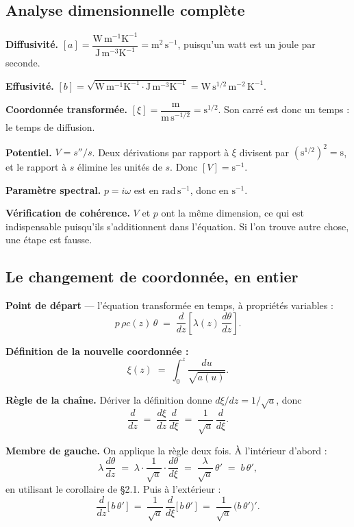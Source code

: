 \documentclass[11pt,a4paper]{article}
\begin{document}
\subsection{Analyse dimensionnelle complète}

\textbf{Diffusivité.}
$[a] = \dfrac{\mathrm{W\,m^{-1}K^{-1}}}{\mathrm{J\,m^{-3}K^{-1}}} = \mathrm{m^{2}\,s^{-1}}$,
puisqu'un watt est un joule par seconde.

\textbf{Effusivité.}
$[b] = \sqrt{\mathrm{W\,m^{-1}K^{-1}} \cdot \mathrm{J\,m^{-3}K^{-1}}}
= \mathrm{W\,s^{1/2}\,m^{-2}\,K^{-1}}$.

\textbf{Coordonnée transformée.}
$[\xi] = \dfrac{\mathrm{m}}{\mathrm{m\,s^{-1/2}}} = \mathrm{s^{1/2}}$.
Son carré est donc un temps : le temps de diffusion.

\textbf{Potentiel.} $V = s''/s$. Deux dérivations par rapport à $\xi$ divisent par
$(\mathrm{s^{1/2}})^{2} = \mathrm{s}$, et le rapport à $s$ élimine les unités de $s$. Donc
$[V] = \mathrm{s^{-1}}$.

\textbf{Paramètre spectral.} $p = i\omega$ est en $\mathrm{rad\,s^{-1}}$, donc en $\mathrm{s^{-1}}$.

\textbf{Vérification de cohérence.} $V$ et $p$ ont la même dimension, ce qui est indispensable
puisqu'ils s'additionnent dans l'équation. Si l'on trouve autre chose, une étape est fausse.

\subsection{Le changement de coordonnée, en entier}

\textbf{Point de départ} --- l'équation transformée en temps, à propriétés variables :
\[ p\,\rho c(z)\,\theta \;=\; \frac{d}{dz}\!\left[\lambda(z)\,\frac{d\theta}{dz}\right] . \]

\textbf{Définition de la nouvelle coordonnée :}
\[ \xi(z) \;=\; \int_{0}^{z} \frac{du}{\sqrt{a(u)}} . \]

\textbf{Règle de la chaîne.} Dériver la définition donne $d\xi/dz = 1/\sqrt{a}$, donc
\[ \frac{d}{dz} \;=\; \frac{d\xi}{dz}\,\frac{d}{d\xi} \;=\; \frac{1}{\sqrt{a}}\,\frac{d}{d\xi} . \]

\textbf{Membre de gauche.} On applique la règle deux fois. À l'intérieur d'abord :
\[ \lambda\,\frac{d\theta}{dz}
\;=\; \lambda\cdot\frac{1}{\sqrt{a}}\cdot\frac{d\theta}{d\xi}
\;=\; \frac{\lambda}{\sqrt{a}}\,\theta' \;=\; b\,\theta' , \]
en utilisant le corollaire de §2.1. Puis à l'extérieur :
\[ \frac{d}{dz}\bigl[\,b\,\theta'\,\bigr]
\;=\; \frac{1}{\sqrt{a}}\,\frac{d}{d\xi}\bigl[\,b\,\theta'\,\bigr]
\;=\; \frac{1}{\sqrt{a}}\,\bigl(b\,\theta'\bigr)' . \]
\end{document}
